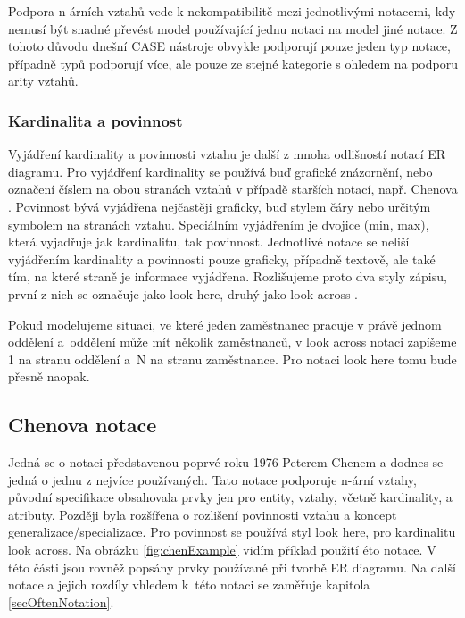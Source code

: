 \documentclass[czech,bachelor,public,dept460,male,oneside]{diploma}
\begin{document}
		Podpora n-árních vztahů vede k nekompatibilitě mezi jednotlivými notacemi, kdy nemusí být snadné převést model používající jednu notaci na model jiné notace. Z tohoto důvodu dnešní CASE nástroje obvykle podporují pouze jeden typ notace, případně typů podporují více, ale pouze ze stejné kategorie s ohledem na podporu arity vztahů. 
		
		\subsubsection{Kardinalita a povinnost}
		Vyjádření kardinality a povinnosti vztahu je další z mnoha odlišností notací ER diagramu. Pro vyjádření kardinality se používá buď grafické znázornění, nebo označení číslem na obou stranách vztahů v případě starších notací, např. Chenova \cite{dbVsb}. Povinnost bývá vyjádřena nejčastěji graficky, buď stylem čáry nebo určitým symbolem na stranách vztahu. Speciálním vyjádřením je dvojice (min, max), která vyjadřuje jak kardinalitu, tak povinnost. Jednotlivé notace se neliší vyjádřením kardinality a povinnosti pouze graficky, případně textově, ale také tím, na které straně je informace vyjádřena. Rozlišujeme proto dva styly zápisu, první z nich se označuje jako look here, druhý jako look across \cite{compErNotations}. 
		
		Pokud modelujeme situaci, ve které jeden zaměstnanec pracuje v právě jednom oddělení a~oddělení může mít několik zaměstnanců, v look across notaci zapíšeme 1 na stranu oddělení a~N na stranu zaměstnance. Pro notaci look here tomu bude přesně naopak. 
		
	
	\subsection{Chenova notace} \label{erDiagramFeatures}
	Jedná se o notaci představenou poprvé roku 1976 Peterem Chenem \cite{chenERD} a dodnes se jedná o jednu z nejvíce používaných. Tato notace podporuje n-ární vztahy, původní specifikace obsahovala prvky jen pro entity, vztahy, včetně kardinality, a atributy. Později byla rozšířena o rozlišení povinnosti vztahu a koncept generalizace/specializace. Pro povinnost se používá styl look here, pro kardinalitu look across. Na obrázku \ref{fig:chenExample} vidím příklad použití éto notace. V této části jsou rovněž popsány prvky používané při tvorbě ER diagramu. Na další notace a jejich rozdíly vhledem k~této notaci se zaměřuje kapitola \ref{secOftenNotation}.
	
\end{document}
